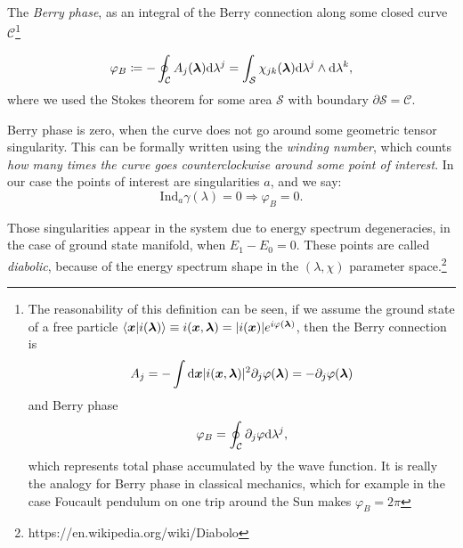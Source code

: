 \begin{definition}
    
    The \emph{Berry phase}, as an integral of the Berry connection along some closed curve $\mathcal{C}$\footnote{
        The reasonability of this definition can be seen, if we assume the ground state of a free particle
        $\braket{\bm{x}|i({\bm\lambda})}\equiv i(\bm{x},{\bm\lambda})= |i(\bm{x})|e^{i\varphi({\bm\lambda})}$,
        then the Berry connection is
        \begin{equation}
            A_j=-\int \mathrm{d} \bm{x}|i(\bm{x},{\bm\lambda})|^2\partial_j \varphi({\bm\lambda}) = -\partial_j \varphi({\bm\lambda})
        \end{equation} 
        and Berry phase
        \begin{equation}
            \varphi_B=\oint_\mathcal{C} \partial_j \varphi \mathrm{d} \lambda^j,
        \end{equation}
        which represents total phase accumulated by the wave function. It is really the analogy for Berry phase in classical mechanics, which for example in the case Foucault pendulum on one trip around the Sun makes $\varphi_B=2\pi$
        }

    \begin{equation}
        \varphi_B\coloneqq-\oint_\mathcal{C} A_j({\bm\lambda})\mathrm{d} \lambda^j=\int_\mathcal{S} \chi_{jk}({\bm\lambda})\mathrm{d} \lambda^j \wedge \mathrm{d}\lambda^k,
    \end{equation}
    where we used the Stokes theorem for some area $\mathcal{S}$ with boundary $\partial\mathcal{S}=\mathcal{C}$.    
    
\end{definition}

Berry phase is zero, when the curve does not go around some geometric tensor singularity. This can be formally written using the \emph{winding number}, which counts \emph{how many times the curve goes counterclockwise around some point of interest}. In our case the points of interest are singularities $a$, and we say:
$$\mathrm{Ind}_a \gamma(\lambda)=0 \Rightarrow \varphi_B=0.$$

Those singularities appear in the system due to energy spectrum degeneracies, in the case of ground state manifold, when $E_1-E_0=0$. These points are called \emph{diabolic}, because of the energy spectrum shape in the $(\lambda,\chi)$ parameter space.\footnote{https://en.wikipedia.org/wiki/Diabolo}




















